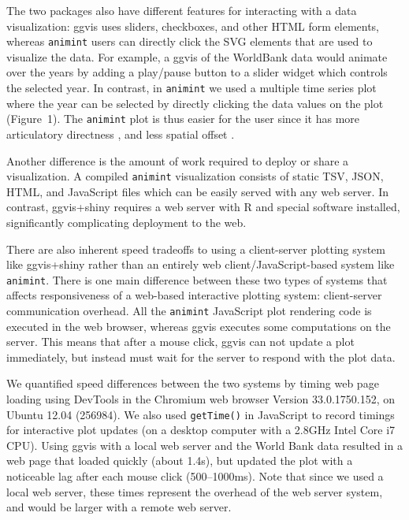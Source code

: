 \documentclass[12pt]{article}\usepackage[]{graphicx}\usepackage[]{color}
\begin{document}
The two packages also have different features for interacting with a
data visualization: ggvis uses sliders, checkboxes, and other HTML
form elements, whereas \texttt{animint} users can directly click the SVG
elements that are used to visualize the data. For example, a ggvis of
the WorldBank data would animate over the years by adding a play/pause
button to a slider widget which controls the selected year. In
contrast, in \texttt{animint} we used a multiple time series plot where the
year can be selected by directly clicking the data values on the plot
(Figure~1). The \texttt{animint} plot is thus easier for the user since it has
more articulatory directness \citep{Hutchins:1985}, and less spatial
offset \citep{instrumental-interaction}.

Another difference is the amount of work required to deploy or share a
visualization. A compiled \texttt{animint} visualization consists of static
TSV, JSON, HTML, and JavaScript files which can be easily served with
any web server. In contrast, ggvis+shiny requires a web server with R
and special software installed, significantly complicating
deployment to the web.

There are also inherent speed tradeoffs to using a client-server
plotting system like ggvis+shiny rather than an entirely web
client/JavaScript-based system like \texttt{animint}. There is one main
difference between these two types of systems that affects
responsiveness of a web-based interactive plotting system:
client-server communication overhead. All the \texttt{animint}
JavaScript plot rendering code is executed in the web browser, whereas
ggvis executes some computations on the server. This means that after
a mouse click, ggvis can not update a plot immediately, but instead
must wait for the server to respond with the plot data.

We quantified speed differences between the two systems by timing web
page loading using DevTools in the Chromium web browser Version
33.0.1750.152, on Ubuntu 12.04 (256984). We also used \texttt{getTime()}
in JavaScript to record timings for interactive plot updates (on a
desktop computer with a 2.8GHz Intel Core i7 CPU). Using ggvis with a
local web server and the World Bank data resulted in a web page that
loaded quickly (about 1.4s), but updated the plot with a noticeable
lag after each mouse click (500--1000ms). Note that since we used a
local web server, these times represent the overhead of the web server
system, and would be larger with a remote web server.
\end{document}

